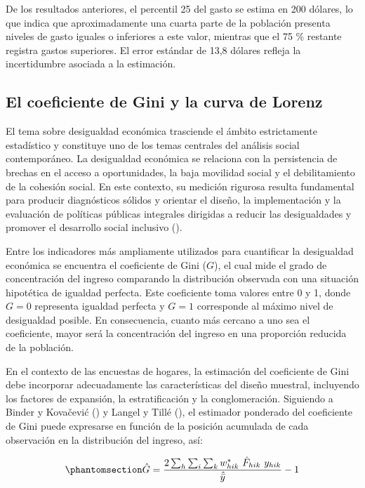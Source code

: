 \documentclass[
  spanish,
  11pt,
  letterpaper,
  oneside,
  open=any]{scrbook}
\begin{document}
De los resultados anteriores, el percentil 25 del gasto se estima en 200
dólares, lo que indica que aproximadamente una cuarta parte de la
población presenta niveles de gasto iguales o inferiores a este valor,
mientras que el 75 \% restante registra gastos superiores. El error
estándar de 13,8 dólares refleja la incertidumbre asociada a la
estimación.

\subsection{El coeficiente de Gini y la curva de
Lorenz}\label{estimacion-del-coeficiente-de-gini}

El tema sobre desigualdad económica trasciende el ámbito estrictamente
estadístico y constituye uno de los temas centrales del análisis social
contemporáneo. La desigualdad económica se relaciona con la persistencia
de brechas en el acceso a oportunidades, la baja movilidad social y el
debilitamiento de la cohesión social. En este contexto, su medición
rigurosa resulta fundamental para producir diagnósticos sólidos y
orientar el diseño, la implementación y la evaluación de políticas
públicas integrales dirigidas a reducir las desigualdades y promover el
desarrollo social inclusivo
().

Entre los indicadores más ampliamente utilizados para cuantificar la
desigualdad económica se encuentra el coeficiente de Gini (\(G\)), el
cual mide el grado de concentración del ingreso comparando la
distribución observada con una situación hipotética de igualdad
perfecta. Este coeficiente toma valores entre 0 y 1, donde \(G = 0\)
representa igualdad perfecta y \(G = 1\) corresponde al máximo nivel de
desigualdad posible. En consecuencia, cuanto más cercano a uno sea el
coeficiente, mayor será la concentración del ingreso en una proporción
reducida de la población.

En el contexto de las encuestas de hogares, la estimación del
coeficiente de Gini debe incorporar adecuadamente las características
del diseño muestral, incluyendo los factores de expansión, la
estratificación y la conglomeración. Siguiendo a Binder y Kovačević
() y Langel y Tillé
(), el estimador ponderado del
coeficiente de Gini puede expresarse en función de la posición acumulada
de cada observación en la distribución del ingreso, así:

\begin{equation}\protect\phantomsection\label{eq-gini-ponderado}{
\hat{G} = \frac{2\sum_{h}\sum_{i}\sum_{k}w_{hik}^{*}
\ \hat{F}_{hik} \ y_{hik}}{\hat{\bar{y}}}-1
}\end{equation}
\end{document}
